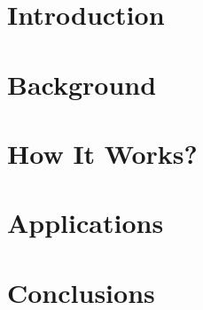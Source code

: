 \section[Intro]{Introduction}


\section[Back]{Background}


\section[How]{How It Works?}


\section[Apps]{Applications}


\section[Concl]{Conclusions}

